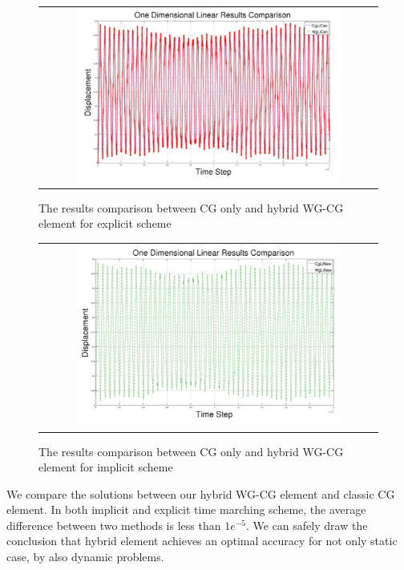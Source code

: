       	      \begin{figure}[H]
      	      	\centering
      	      	\begin{tabular}{c}
      	      		\includegraphics[width=0.8\textwidth]{./pics/result1d2.png}
      	      	\end{tabular}
      	      	\caption{\footnotesize The results comparison between CG only and hybrid WG-CG element for explicit scheme}
      	      \end{figure}
      	      
      	       \begin{figure}[H]
      	       	\centering
      	       	\begin{tabular}{c}
      	       		\includegraphics[width=0.8\textwidth]{./pics/result1d3.png}
      	       	\end{tabular}
      	       	\caption{\footnotesize The results comparison between CG only and hybrid WG-CG element for implicit scheme}
      	       \end{figure}
      	       
      	       We compare the solutions between our hybrid WG-CG element and classic CG element. In both implicit and explicit time marching scheme, the average difference between two methods is less than $ 1e^{-5} $. We can safely draw the conclusion that hybrid element achieves an optimal accuracy for not only static case, by also dynamic problems.
      	       
